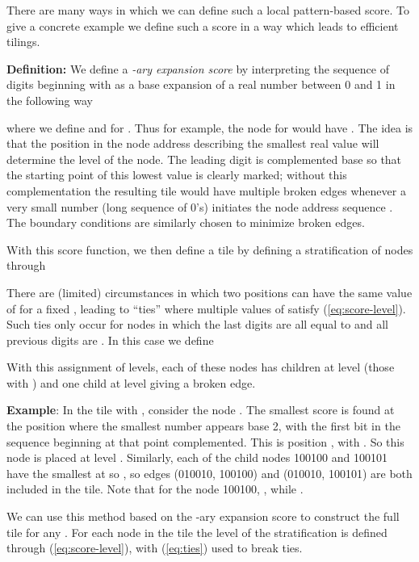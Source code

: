\documentclass[12pt]{article}
\begin{document}
There are many ways in which we can define such a local pattern-based
score.  To give a concrete example we define such a score in a way
which leads to efficient tilings.

\vspace*{0.1in}

\noindent
{\bf Definition:} We define a {\it -ary expansion
score} by interpreting the sequence
of digits beginning with  as a base  expansion of a  real number
between 0 and 1 in the following way

where we define   and  for
.  Thus for example, the node  for 
would have .  The idea
is that the position in the node address describing the smallest
real value will determine the level of the node.
The leading digit is complemented base  so that the starting point of this
lowest value is clearly marked; without this complementation the
resulting tile would have multiple broken edges whenever  a very small
number (long sequence of 0's) initiates the node address sequence .  The boundary conditions are similarly chosen to minimize
broken edges.

With this score function, we then define a tile by defining a
stratification of nodes through

There are (limited)
circumstances in which two positions 
can have the same value of  for a fixed , leading to
``ties'' where multiple values of  satisfy (\ref{eq:score-level}).
Such ties only occur for nodes in which the last  digits are all
equal to  and all previous digits are .  In this case we define

With this assignment of levels, each of these nodes has 
children at level  (those with ) and one child at
level  
giving a broken edge.

\vspace*{0.1in}

\noindent
{\bf Example}: In the tile with , consider the node .  The smallest score is found at the position
where the smallest number appears base 2, with the first bit in the
sequence beginning at that point complemented.  This is position , with .  So
this node is placed at level .  Similarly, each
of the child nodes 100100 and 100101 have the smallest  at  so , so edges (010010,
100100) and (010010, 100101) are both included in the tile.  Note that
for the node 100100, , while .

We can use this method based on the -ary expansion
score to construct the full tile for any .   For each node in
the tile the level of the stratification is defined through
(\ref{eq:score-level}), with (\ref{eq:ties}) used to break ties.
\vspace*{0.1in}
\end{document}
